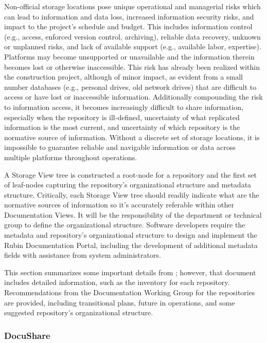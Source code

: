 Non-official storage locations pose unique operational and managerial risks which can lead to information and data loss, increased information security risks, and impact to the project's schedule and budget.
This includes information control (e.g., access, enforced version control, archiving), reliable data recovery, unknown or unplanned risks, and lack of available support (e.g., available labor, expertise).
Platforms may become unsupported or unavailable and the information therein becomes lost or otherwise inaccessible.
This risk has already been realized within the construction project, although of minor impact, as evident from a small number databases (e.g., personal drives, old network drives) that are difficult to access or have lost or inaccessible information. 
Additionally compounding the risk to information access, it becomes increasingly difficult to share information, especially when the repository is ill-defined, uncertainty of what replicated information is the most current, and uncertainty of which repository is the normative source of information.
Without a discrete set of storage locations, it is impossible to guarantee reliable and navigable information or data across multiple platforms throughout operations.

A Storage View tree is constructed a root-node for a repository and the first set of leaf-nodes capturing the repository's organizational structure and metadata structure.
Critically, each Storage View tree should readily indicate what are the normative sources of information so it's accurately referable within other Documentation Views.
It will be the responsibility of the department or technical group to define the organizational structure.
Software developers require the metadata and repository's organizational structure to design and implement the Rubin Documentation Portal, including the development of additional metadata fields with assistance from system administrators.

This section summarizes some important details from ; however, that document includes detailed information, such as the inventory for each repository.
Recommendations from the Documentation Working Group for the repositories are provided, including transitional plans, future in operations, and some suggested repository's organizational structure.

\subsubsection{DocuShare}

